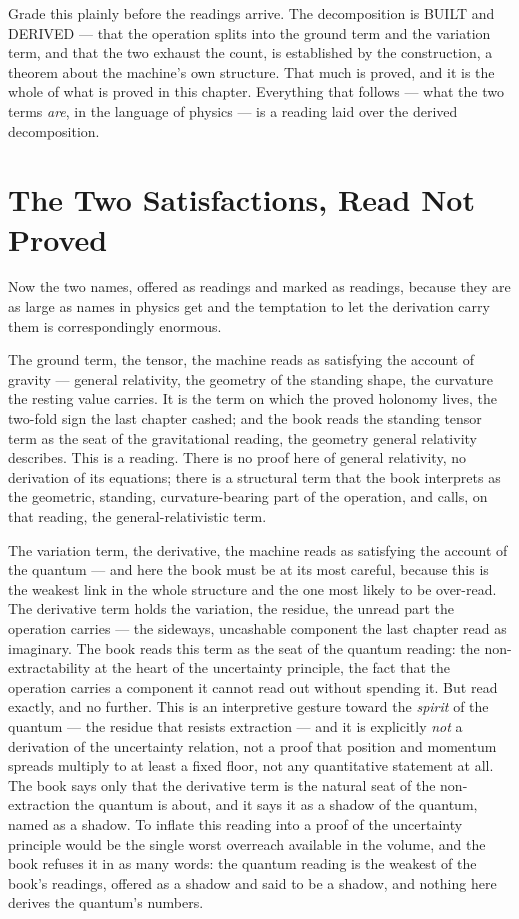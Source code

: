 Grade this plainly before the readings arrive. The decomposition is BUILT and DERIVED --- that the operation
splits into the ground term and the variation term, and that the two exhaust the count, is established by the
construction, a theorem about the machine's own structure. That much is proved, and it is the whole of what is
proved in this chapter. Everything that follows --- what the two terms \emph{are}, in the language of physics ---
is a reading laid over the derived decomposition.

\section{The Two Satisfactions, Read Not Proved}

Now the two names, offered as readings and marked as readings, because they are as large as names in physics get
and the temptation to let the derivation carry them is correspondingly enormous.

The ground term, the tensor, the machine reads as satisfying the account of gravity --- general relativity, the
geometry of the standing shape, the curvature the resting value carries. It is the term on which the proved
holonomy lives, the two-fold sign the last chapter cashed; and the book reads the standing tensor term as the
seat of the gravitational reading, the geometry general relativity describes. This is a reading. There is no proof
here of general relativity, no derivation of its equations; there is a structural term that the book interprets as
the geometric, standing, curvature-bearing part of the operation, and calls, on that reading, the general-relativistic
term.

The variation term, the derivative, the machine reads as satisfying the account of the quantum --- and here the
book must be at its most careful, because this is the weakest link in the whole structure and the one most likely
to be over-read. The derivative term holds the variation, the residue, the unread part the operation carries ---
the sideways, uncashable component the last chapter read as imaginary. The book reads this term as the seat of the
quantum reading: the non-extractability at the heart of the uncertainty principle, the fact that the operation
carries a component it cannot read out without spending it. But read exactly, and no further. This is an
interpretive gesture toward the \emph{spirit} of the quantum --- the residue that resists extraction --- and it is
explicitly \emph{not} a derivation of the uncertainty relation, not a proof that position and momentum spreads
multiply to at least a fixed floor, not any quantitative statement at all. The book says only that the derivative
term is the natural seat of the non-extraction the quantum is about, and it says it as a shadow of the quantum,
named as a shadow. To inflate this reading into a proof of the uncertainty principle would be the single worst
overreach available in the volume, and the book refuses it in as many words: the quantum reading is the weakest of
the book's readings, offered as a shadow and said to be a shadow, and nothing here derives the quantum's numbers.

